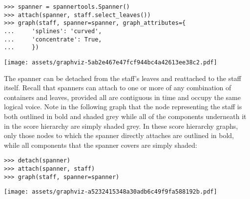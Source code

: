 \begin{comment}
<abjad>
spanner = spannertools.Spanner()
attach(spanner, staff.select_leaves())
graph(staff, spanner=spanner, graph_attributes={
    'splines': 'curved',
    'concentrate': True,
    })
</abjad>
\end{comment}

\begin{abjadbookoutput}
\begin{singlespacing}
\vspace{-0.5\baselineskip}
\begin{verbatim}
>>> spanner = spannertools.Spanner()
>>> attach(spanner, staff.select_leaves())
>>> graph(staff, spanner=spanner, graph_attributes={
...     'splines': 'curved',
...     'concentrate': True,
...     })
\end{verbatim}
\noindent\texttt{[image: assets/graphviz-5ab2e467e47fcf944bc4a42613ee38c2.pdf]}
\end{singlespacing}
\end{abjadbookoutput}

\noindent The spanner can be detached from the staff's leaves and reattached to
the staff itself. Recall that spanners can attach to one or more of any
combination of containers and leaves, provided all are contiguous in time and
occupy the same logical voice. Note in the following graph that the node
representing the staff is both outlined in bold and shaded grey while all of
the components underneath it in the score hierarchy are simply shaded grey. In
these score hierarchy graphs, only those nodes to which the spanner directly
attaches are outlined in bold, while all components that the spanner
covers are simply shaded:

\begin{comment}
<abjad>
detach(spanner)
attach(spanner, staff)
graph(staff, spanner=spanner)
</abjad>
\end{comment}

\begin{abjadbookoutput}
\begin{singlespacing}
\vspace{-0.5\baselineskip}
\begin{verbatim}
>>> detach(spanner)
>>> attach(spanner, staff)
>>> graph(staff, spanner=spanner)
\end{verbatim}
\noindent\texttt{[image: assets/graphviz-a5232415348a30adb6c49f9fa588192b.pdf]}
\end{singlespacing}
\end{abjadbookoutput}

